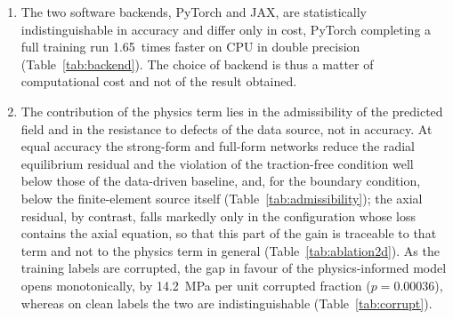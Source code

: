 \documentclass[subscriptcorrection,upint,varvw,barcolor=Goldenrod3,mathalfa=cal=euler,balance,hyphenate,french,pdf-a]{asmejour} %
\begin{document}
\begin{enumerate}
\item The two software backends, PyTorch and JAX, are statistically indistinguishable in accuracy and differ only in cost, PyTorch completing a full training run 1.65~times faster on CPU in double precision (Table~\ref{tab:backend}). The choice of backend is thus a matter of computational cost and not of the result obtained. %

\item The contribution of the physics term lies in the admissibility of the predicted field and in the resistance to defects of the data source, not in accuracy. At equal accuracy the strong-form and full-form networks reduce the radial equilibrium residual and the violation of the traction-free condition well below those of the data-driven baseline, and, for the boundary condition, below the finite-element source itself (Table~\ref{tab:admissibility}); the axial residual, by contrast, falls markedly only in the configuration whose loss contains the axial equation, so that this part of the gain is traceable to that term and not to the physics term in general (Table~\ref{tab:ablation2d}). As the training labels are corrupted, the gap in favour of the physics-informed model opens monotonically, by 14.2~MPa per unit corrupted fraction ($p=0.00036$), whereas on clean labels the two are indistinguishable (Table~\ref{tab:corrupt}).


\end{enumerate}
\end{document}
